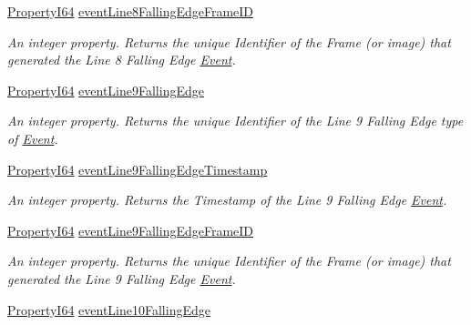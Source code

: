 \begin{DoxyCompactItemize}
\hyperlink{group___common_interface_ga81749b2696755513663492664a18a893}{Property\+I64} \hyperlink{classmv_i_m_p_a_c_t_1_1acquire_1_1_gen_i_cam_1_1_event_control_aa894cda89683f6bd7b84bf6273f4395e}{event\+Line8\+Falling\+Edge\+Frame\+I\+D}
\begin{DoxyCompactList}\small\item\em An integer property. Returns the unique Identifier of the Frame (or image) that generated the Line 8 Falling Edge \hyperlink{classmv_i_m_p_a_c_t_1_1acquire_1_1_event}{Event}. \end{DoxyCompactList}\item 
\hyperlink{group___common_interface_ga81749b2696755513663492664a18a893}{Property\+I64} \hyperlink{classmv_i_m_p_a_c_t_1_1acquire_1_1_gen_i_cam_1_1_event_control_af2176f2a5d6d6a1075a0f51ea8343860}{event\+Line9\+Falling\+Edge}
\begin{DoxyCompactList}\small\item\em An integer property. Returns the unique Identifier of the Line 9 Falling Edge type of \hyperlink{classmv_i_m_p_a_c_t_1_1acquire_1_1_event}{Event}. \end{DoxyCompactList}\item 
\hyperlink{group___common_interface_ga81749b2696755513663492664a18a893}{Property\+I64} \hyperlink{classmv_i_m_p_a_c_t_1_1acquire_1_1_gen_i_cam_1_1_event_control_a56832c12a54d4776449685346cfd05da}{event\+Line9\+Falling\+Edge\+Timestamp}
\begin{DoxyCompactList}\small\item\em An integer property. Returns the Timestamp of the Line 9 Falling Edge \hyperlink{classmv_i_m_p_a_c_t_1_1acquire_1_1_event}{Event}. \end{DoxyCompactList}\item 
\hyperlink{group___common_interface_ga81749b2696755513663492664a18a893}{Property\+I64} \hyperlink{classmv_i_m_p_a_c_t_1_1acquire_1_1_gen_i_cam_1_1_event_control_a5ec264c966aa05f950082850e0b5107a}{event\+Line9\+Falling\+Edge\+Frame\+I\+D}
\begin{DoxyCompactList}\small\item\em An integer property. Returns the unique Identifier of the Frame (or image) that generated the Line 9 Falling Edge \hyperlink{classmv_i_m_p_a_c_t_1_1acquire_1_1_event}{Event}. \end{DoxyCompactList}\item 
\hyperlink{group___common_interface_ga81749b2696755513663492664a18a893}{Property\+I64} \hyperlink{classmv_i_m_p_a_c_t_1_1acquire_1_1_gen_i_cam_1_1_event_control_ab58e919e16105aabb860c6c63572c1e4}{event\+Line10\+Falling\+Edge}

\end{DoxyCompactItemize}
